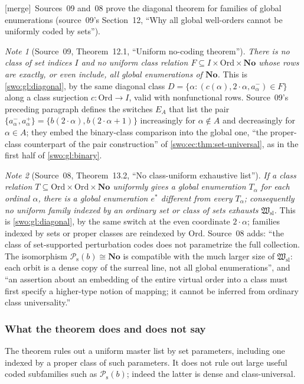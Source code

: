 \documentclass[11pt]{article}
\theoremstyle{definition}
\theoremstyle{remark}
\newtheorem{note}[note]{Note}
\newcommand{\No}{\mathbf{No}}
\newcommand{\Ord}{\mathrm{Ord}}
\newcommand{\Hsl}{\mathfrak W_{\mathrm{sl}}}
\newcommand{\Psupp}{\mathcal P_{\mathrm{s}}}
\newcommand{\merge}{\textsf{[merge]}}
\begin{document}

\merge\ Sources~09 and~08 prove the diagonal theorem for families of global
enumerations (source~09's Section~12, ``Why all global well-orders cannot be
uniformly coded by sets''\label{swo:ec:sec:diagonal}).

\begin{note}[Source~09, Theorem~12.1, ``Uniform no-coding theorem'']\label{swo:ec:thm:diagonal}
\emph{There is no class of set indices $I$ and no uniform class relation
$F\subseteq I\times\Ord\times\No$ whose rows are exactly, or even include, all
global enumerations of $\No$.} This is \cref{swo:gl:diagonal}, by the same
diagonal class $D=\{\alpha:(c(\alpha),2\cdot\alpha,a_\alpha^-)\in F\}$ along a
class surjection $c:\Ord\to I$, valid with nonfunctional rows. Source~09's
preceding paragraph defines the switches $E_A$ that list the pair
$\{a_\alpha^-,a_\alpha^+\}=\{b(2\cdot\alpha),b(2\cdot\alpha+1)\}$ increasingly
for $\alpha\notin A$ and decreasingly for $\alpha\in A$; they embed the
binary-class comparison into the global one, ``the proper-class counterpart
of the pair construction'' of \cref{swo:ec:thm:set-universal}, as in the first
half of \cref{swo:gl:binary}.
\end{note}

\begin{note}[Source~08, Theorem~13.2, ``No class-uniform exhaustive list'']\label{swo:sk:thm:diagonal}
\emph{If a class relation $T\subseteq\Ord\times\Ord\times\No$ uniformly gives
a global enumeration $T_\alpha$ for each ordinal $\alpha$, there is a global
enumeration $e^*$ different from every $T_\alpha$; consequently no uniform
family indexed by an ordinary set or class of sets exhausts $\Hsl$.} This is
\cref{swo:gl:diagonal}, by the same switch at the even coordinate
$2\cdot\alpha$; families indexed by sets or proper classes are reindexed by
$\Ord$. Source~08 adds: ``the class of set-supported perturbation codes does
not parametrize the full collection. The isomorphism $\Psupp(b)\cong\No$ is
compatible with the much larger size of $\Hsl$: each orbit is a dense copy of
the surreal line, not all global enumerations'', and ``an assertion about an
embedding of the entire virtual order into a class must first specify a
higher-type notion of mapping; it cannot be inferred from ordinary class
universality.''
\end{note}

\subsubsection{What the theorem does and does not say}
The theorem rules out a uniform master list by set parameters, including
one indexed by a proper class of such parameters. It does not rule out
large useful coded subfamilies such as $\Psupp(b)$; indeed the latter is
dense and class-universal.
\end{document}
